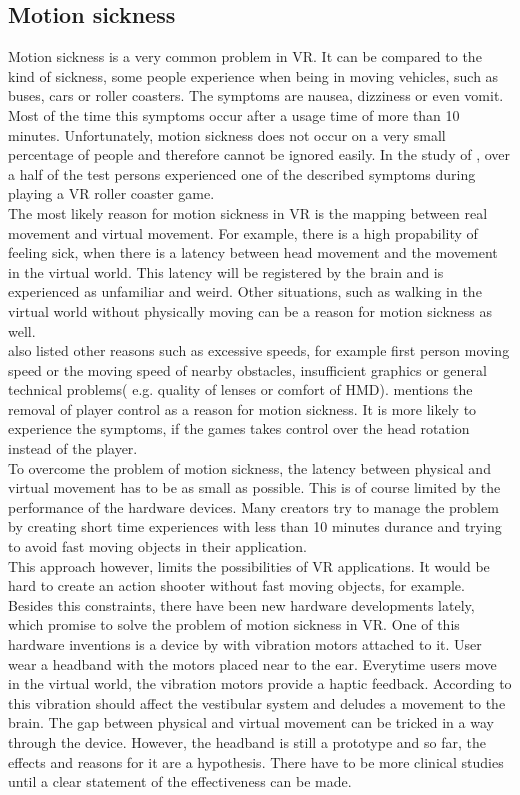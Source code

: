 \subsection{Motion sickness}
Motion sickness is a very common problem in VR. It can be compared to the kind of sickness, some people experience when being in moving vehicles, such as buses, cars or roller coasters. The symptoms are nausea, dizziness or even vomit. Most of the time this symptoms occur after a usage time of more than 10 minutes. Unfortunately, motion sickness does not occur on a very small percentage of people and therefore cannot be ignored easily. In the study of \cite{Siess.2017}, over a half of the test persons experienced one of the described symptoms during playing a VR roller coaster game.\\
The most likely reason for motion sickness in VR is the mapping between real movement and virtual movement. For example, there is a high propability of feeling sick, when there is a latency between head movement and the movement in the virtual world. This latency  will be registered by the brain and is experienced as unfamiliar and weird. Other situations, such as walking in the virtual world without physically moving can be a reason for motion sickness as well. \cite{Dorner.2013} \\ \cite{Siess.2017} also listed other reasons such as excessive speeds, for example first person moving speed or the moving speed of nearby obstacles, insufficient graphics or general technical problems( e.g. quality of lenses or comfort of HMD).
\cite{Fenlon.2013} mentions the removal of player control as a reason for motion sickness. It is more likely to experience the symptoms, if the games takes control over the head rotation instead of the player. \\
To overcome the problem of motion sickness, the latency between physical and virtual movement has to be as small as possible. This is of course limited by the performance of the hardware devices. Many creators try to manage the problem by creating short time experiences with less than 10 minutes durance and trying to avoid fast moving objects in their application. \cite{Doerner.2013}\\
This approach however, limits the possibilities of VR applications. It would be hard to create an action shooter without fast moving objects, for example. \\
Besides this constraints, there have been new hardware developments lately, which promise to solve the problem of motion sickness in VR. One of this hardware inventions is a device by \cite{?} with vibration motors attached to it. User wear a headband with the motors placed near to the ear. Everytime users move in the virtual world, the vibration motors provide a haptic feedback. According to \cite{?} this vibration should affect the vestibular system and deludes a movement to the brain. The gap between physical and virtual movement can be tricked in a way through the device. However, the headband is still a prototype and so far, the effects and reasons for it are a hypothesis. There have to be more clinical studies until a clear statement of the effectiveness can be made.\\
